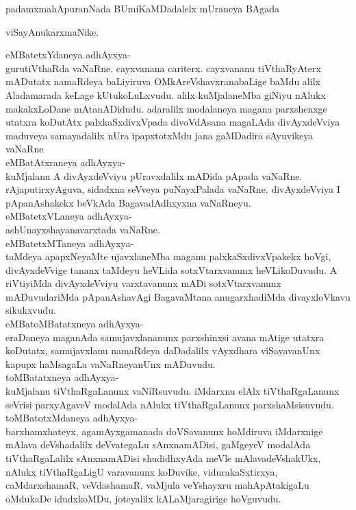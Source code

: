 \documentclass{article}
\begin{document}
\begin{center}
padamxmahApuranNada BUmiKaMDadalelx mUraneya BAgada
\end{center}

\begin{center}
viSayAnukarxmaNike.
\end{center}

eMBatetxYdaneya adhAyxya-\\
gurutiVthaRda vaNaRne. cayxvanana cariterx. cayxvananu tiVthaRyAterx mADutatx namaRdeya baLiyiruva OMkAreVshavxranabaLige baMdu alilx Aladamarada keLage kUtukoLuLxvudu. alilx kuMjalaneMba giNiyu nAlukx makakxLoDane mAtanADidudu. adaralilx modalaneya magana parxshenxge utatxra koDutAtx palxkaSxdivxVpada divoVdAsana magaLAda divAyxdeVviya maduveya samayadalilx nUra ipapxtotxMdu jana gaMDadira sAyuvikeya vaNaRne\\
eMBatAtxraneya adhAyxya-\\
kuMjalanu A divAyxdeVviyu pUravxdalilx mADida pApada vaNaRne. rAjaputirxyAguva, sidadxna seVveya puNayxPalada vaNaRne. divAyxdeVviya I pApanAshakekx beVkAda BagavadAdhxyxna vaNaRneyu.\\
eMBatetxVLaneya adhAyxya-\\
ashUnayxshayanavarxtada vaNaRne.\\
eMBatetxMTaneya adhAyxya-\\
taMdeya apapxNeyaMte ujavxlaneMba maganu palxkaSxdivxVpakekx hoVgi, divAyxdeVvige tananx taMdeyu heVLida sotxVtarxvanunx heVLikoDuvudu. A riVtiyiMda divAyxdeVviyu varxtavanunx mADi sotxVtarxvanunx mADuvudariMda pApanAshavAgi BagavaMtana anugarxhadiMda divayxloVkavu sikukxvudu.\\
eMBatoMBatatxneya adhAyxya-\\
eraDaneya maganAda samujavxlananunx parxshinxsi avana mAtige utatxra koDutatx, samujavxlanu namaRdeya daDadalilx vAyxdhara viSayavanUnx kapupx haMsagaLa vaNaRneyanUnx mADuvudu.\\
toMBatatxneya adhAyxya-\\
kuMjalanu tiVthaRgaLanunx vaNiRsuvudu. iMdarxnu elAlx tiVthaRgaLanunx seVrisi parxyAgaveV modalAda nAlukx tiVthaRgaLanunx parxshaMsisuvudu.\\
toMBatotxMdaneya adhAyxya-\\
barxhamxhateyx, agamAyxgamanada doVSavanunx hoMdiruva iMdarxnige mAlava deVshadalilx deVvategaLu sAnxnamADisi, gaMgeyeV modalAda tiVthaRgaLalilx sAnxnamADisi shudidhxyAda meVle mAlavadeVshakUkx, nAlukx tiVthaRgaLigU varavanunx koDuvike, vidurakaSxtirxya, caMdarxshamaR, veVdashamaR, vaMjula veYshayxru mahApAtakigaLu oMdukaDe idudxkoMDu, joteyalilx kALaMjaragirige hoVguvudu.\\
\end{document}
